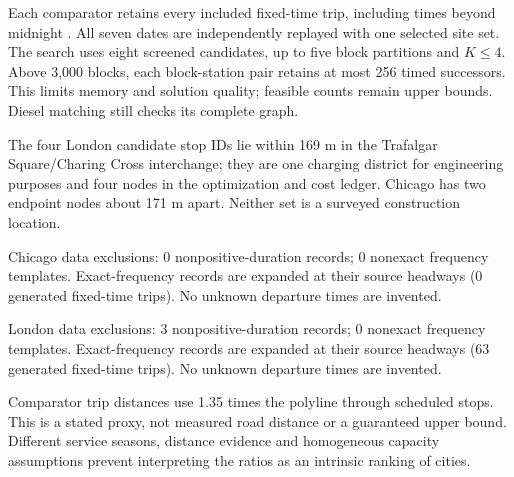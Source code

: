 Each comparator retains every included fixed-time trip, including times beyond midnight \cite{ref25}. All seven dates are independently replayed with one selected site set. The search uses eight screened candidates, up to five block partitions and $K\le4$. Above 3,000 blocks, each block-station pair retains at most 256 timed successors. This limits memory and solution quality; feasible counts remain upper bounds. Diesel matching still checks its complete graph.


The four London candidate stop IDs lie within 169 m in the Trafalgar Square/Charing Cross interchange; they are one charging district for engineering purposes and four nodes in the optimization and cost ledger. Chicago has two endpoint nodes about 171 m apart. Neither set is a surveyed construction location.


Chicago data exclusions: 0 nonpositive-duration records; 0 nonexact frequency templates. Exact-frequency records are expanded at their source headways (0 generated fixed-time trips). No unknown departure times are invented.


London data exclusions: 3 nonpositive-duration records; 0 nonexact frequency templates. Exact-frequency records are expanded at their source headways (63 generated fixed-time trips). No unknown departure times are invented.


Comparator trip distances use 1.35 times the polyline through scheduled stops. This is a stated proxy, not measured road distance or a guaranteed upper bound. Different service seasons, distance evidence and homogeneous capacity assumptions prevent interpreting the ratios as an intrinsic ranking of cities.

